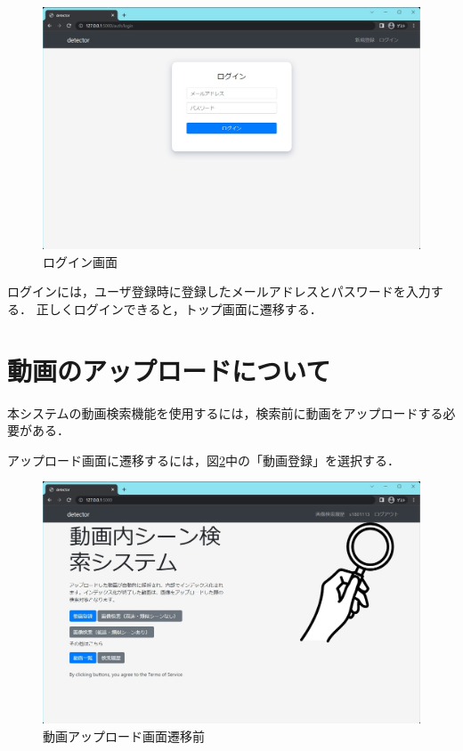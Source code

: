 \documentclass[a4j,12pt,dvipdfmx]{jreport}
\begin{document}
\begin{figure}[H]
  \centering
  \includegraphics[width=13cm]{image/user_login.jpg}
  \caption{ログイン画面}
  \label{fig:user_login}
\end{figure}

ログインには，ユーザ登録時に登録したメールアドレスとパスワードを入力する．
正しくログインできると，トップ画面に遷移する．

\section{動画のアップロードについて}
本システムの動画検索機能を使用するには，検索前に動画をアップロードする必要がある．

アップロード画面に遷移するには，図\ref{fig:index}中の「動画登録」を選択する．

\begin{figure}[H]
  \centering
  \includegraphics[width=13cm]{image/index.jpg}
  \caption{動画アップロード画面遷移前}
  \label{fig:index}
\end{figure}
\end{document}
